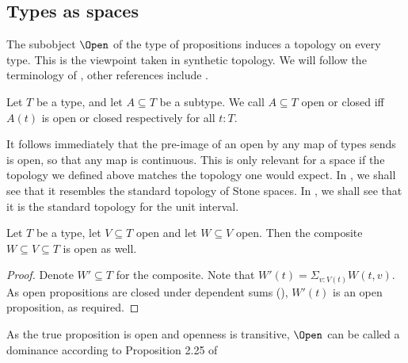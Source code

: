\subsection{Types as spaces}
The subobject $\Open$ of the type of propositions induces a topology on every type. 
This is the viewpoint taken in synthetic topology. 
We will follow the terminology of \cite{SyntheticTopologyLesnik}, 
other references include \cite{SyntheticTopologyEscardo, TODOSortOutTaylorsReferences}.

\begin{definition}
  Let $T$ be a type, and let $A\subseteq T$ be a subtype. 
  We call $A\subseteq T$ open or closed iff $A(t)$ is open or closed respectively for all $t:T$.
\end{definition}

\begin{remark}
  It follows immediately that the pre-image of an open by any map of types sends is open, so that any map is continuous. 
  This is only relevant for a space if the topology we defined above matches the topology one would expect. 
  In , we shall see that it resembles the standard topology of Stone spaces.
  In , we shall see that it is the standard topology for the unit interval. 
\end{remark}

\begin{lemma}\label{OpenTransitive}
  Let $T$ be a type, let $V\subseteq T$ open and let $W\subseteq V$ open. 
  Then the composite $W\subseteq V\subseteq T$ is open as well. 
\end{lemma}
\begin{proof}
  Denote $W'\subseteq T$ for the composite. 
  Note that $W'(t) = \Sigma_{v:V(t)} W(t,v)$. 
  As open propositions are closed under dependent sums (), 
  $W'(t)$ is an open proposition, as required. 
\end{proof}

\begin{remark}\label{OpenDominance}
  As the true proposition is open and openness is transitive, 
  $\Open$ can be called a dominance according to Proposition 2.25 of \cite{SyntheticTopologyLesnik}
\end{remark}



